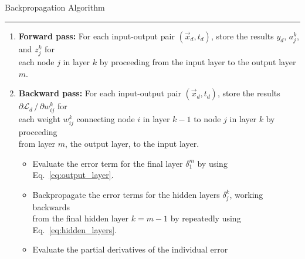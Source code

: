 \documentclass[../main.tex]{subfiles}
\begin{document}
%
\begin{algorithm}[htpb]
    \AlgoDontDisplayBlockMarkers\SetAlgoNoEnd\SetAlgoNoLine%
    \DontPrintSemicolon%
    \caption{Backpropagation Algorithm}%
    \begin{center}\rule{0.5\linewidth}{\linethickness}\end{center}
    \begin{enumerate}
      \item \textbf{Forward pass:} For each input-output pair $(\vec{x}_{d},
        t_{d})$, store the results $y_{d}$, $a_{j}^{k}$, and $z_{j}^{k}$ for \\
        each node $j$ in layer $k$ by proceeding from the input layer to the
        output layer $m$.\;
      \item \textbf{Backward pass:} For each input-output pair $(\vec{x}_{d},
        t_{d})$, store the results $\partial \mathcal{L}_{d}\,/\, \partial
        w_{ij}^{k}$ for \\
        each weight $w_{ij}^{k}$ connecting node $i$ in layer $k - 1$ to node
        $j$ in layer $k$ by proceeding \\
        from layer $m$, the output layer, to the input layer.\;
        \begin{itemize}
          \item Evaluate the error term for the final layer $\delta_{1}^{m}$ by
            using Eq.~\ref{eq:output_layer}.\;
          \item Backpropagate the error terms for the hidden layers
            $\delta_{j}^{k}$, working backwards \\
            from the final hidden layer $k = m - 1$ by repeatedly using
            Eq.~\ref{eq:hidden_layers}.\;
          \item Evaluate the partial derivatives of the individual error

\end{itemize}
\end{enumerate}
\end{algorithm}
\end{document}
